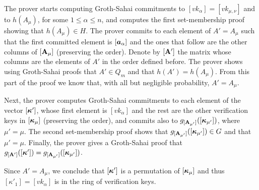 The prover starts computing Groth-Sahai commitments to $[vk_\alpha]=[vk_{\mu,\nu}]$ and to $h(A_\mu)$, for some $1\leq \alpha \leq n$, and computes the first set-membership proof showing that $h(A_\mu)\in H$.
The prover commits to each element of $A'=A_\mu$ such that the first committed element is $[{\boldsymbol{a}}_\alpha]$ and the ones that follow are the other columns of $[\mathbf{{A}}_\mu]$ (preserving the order). Denote by $[\mathbf{{A}}']$ the matrix whose columns are the elements of $A'$ in the order defined before.  The prover shows using Groth-Sahai proofs that $A'\in Q_m$ and that $h(A')=h(A_\mu)$. From this part of the proof we know that, with all but negligible probability, $A'=A_\mu$.

Next, the prover computes Groth-Sahai commitments to each element of the vector $[{\boldsymbol{\kappa}}']$, whose first element is $[vk_\alpha]$ and the rest are the other verification keys in $[{\boldsymbol{\kappa}}_\mu]$ (preserving the order), and commits also to $g_{[\mathbf{{A_{\mu'}}}]}([{\boldsymbol{\kappa}}_{\mu'}])$, where $\mu'=\mu$. The second set-membership proof shows that $g_{[\mathbf{{A_{\mu'}}}]}([{\boldsymbol{\kappa}}_{\mu'}])\in G$ and that $\mu'=\mu$. Finally, the prover gives a Groth-Sahai proof that $g_{[\mathbf{{A}}']}([{\boldsymbol{\kappa}}'])=g_{[\mathbf{{A_{\mu'}}}]}([{\boldsymbol{\kappa}}_{\mu'}])$.

Since $A'=A_\mu$, we conclude that $[{\boldsymbol{\kappa}}']$ is a permutation of $[{\boldsymbol{\kappa}}_\mu]$ and thus $[\kappa'_1]=[vk_\alpha]$ is in the ring of verification keys.


